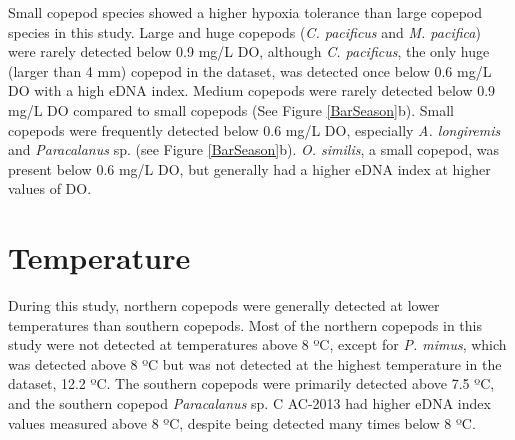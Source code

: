 \documentclass[12pt,twoside]{reedthesis}
\begin{document}
	Small copepod species showed a higher hypoxia tolerance than large copepod species in this study. Large and huge copepods (\textit{C. pacificus} and \textit{M. pacifica}) were rarely detected below 0.9 mg/L DO, although \textit{C. pacificus}, the only huge (larger than 4 mm) copepod in the dataset, was detected once below 0.6 mg/L DO with a high eDNA index. Medium copepods were rarely detected below 0.9 mg/L DO compared to small copepods (See Figure \ref{BarSeason}b). Small copepods were frequently detected below 0.6 mg/L DO, especially \textit{A. longiremis} and \textit{Paracalanus} sp. (see Figure \ref{BarSeason}b). \textit{O. similis}, a small copepod, was present below 0.6 mg/L DO, but generally had a higher eDNA index at higher values of DO.
	
	
	\section{Temperature}
	
	During this study, northern copepods were generally detected at lower temperatures than southern copepods. Most of the northern copepods in this study were not detected at temperatures above 8 ºC, except for \textit{P. mimus}, which was detected above 8 ºC but was not detected at the highest temperature in the dataset, 12.2 ºC. The southern copepods were primarily detected above 7.5 ºC, and the southern copepod \textit{Paracalanus} sp. C AC-2013 had higher eDNA index values measured above 8 ºC, despite being detected many times below 8 ºC. 
	
\end{document}
